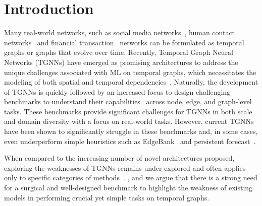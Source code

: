 

\section{Introduction}
 Many real-world networks, such as social media networks~\cite{tgb}, human contact networks~\cite{shirzadkhani2024static} and financial transaction~\cite{shamsi2024graphpulse} networks can be formulated as temporal graphs or graphs that evolve over time. Recently, Temporal Graph Neural Networks (TGNNs) have emerged as promising architectures to address the unique challenges associated with ML on temporal graphs, which necessitates the modeling of both spatial and temporal dependencies~\citep{tgn, tgat, dygformer, skarding_tg_survey, ctan, feng_tg_survey}. Naturally, the development of TGNNs is quickly followed by an increased focus to design challenging benchmarks to understand their capabilities~\citep{poursafaei2022betterevaluationdynamiclink, tgb, tgb2.0, tgb-seq, shirzadkhani2024towards} across node, edge, and graph-level tasks. These benchmarks provide significant challenges for TGNNs in both scale and domain diversity with a focus on real-world tasks. However, current TGNNs have been shown to significantly struggle in these benchmarks and, in some cases, even underperform simple heuristics such as EdgeBank~\citep{poursafaei2022betterevaluationdynamiclink} and persistent forecast~\citep{tgb}.

 When compared to the increasing number of novel architectures proposed, exploring the weaknesses of TGNNs remains under-explored and often applies only to specific categories of methods~\citep{pint, weisfeiler-go-dynamic, tjandra2024enhancingexpressivitytemporalgraph, salzer2025logicalexpressivenesstemporalgnns}. , and we argue that there is a strong need for a surgical and well-designed benchmark to highlight the weakness of existing models in performing crucial yet simple tasks on temporal graphs.

